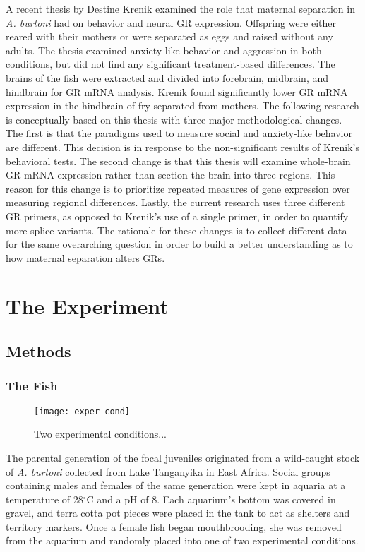 \documentclass[12pt,twoside]{reedthesis}
\begin{document}
A recent thesis by Destine Krenik examined the role that maternal separation in
\textit{A. burtoni} had on behavior and neural GR
expression. Offspring were either reared with their mothers or were separated as
eggs and raised without any adults. The thesis examined anxiety-like behavior and aggression in both
conditions, but did not find any significant treatment-based differences. The
brains of the fish were extracted and divided into forebrain, midbrain, and hindbrain for
GR mRNA analysis. Krenik found significantly lower GR mRNA expression in
the hindbrain of fry separated from mothers. The following research is
conceptually based on this thesis with three major methodological changes. The
first is that the paradigms used to measure social and anxiety-like behavior
are different. This decision is in response to the non-significant results of
Krenik's behavioral tests. The second change is that this thesis will examine
whole-brain GR mRNA expression rather than section the brain into three regions.
This reason for this change is to prioritize repeated measures of gene
expression over measuring regional differences. Lastly,
the current research uses three different GR primers, as opposed to Krenik's use
of a single primer, in order to quantify
more splice variants. The rationale for these changes is to collect different
data for the same overarching question in order to build a better understanding
as to how
maternal separation alters GRs.

\chapter{The Experiment}

\section{Methods}
\subsection{The Fish}

\begin{figure}[htbp] 
\begin{centering} 
\texttt{[image: exper\_cond]}
\caption[Experimental Conditions]{Two experimental conditions...} 
\label{subd}
\end{centering} 
\end{figure}


The parental generation of the focal juveniles originated from a wild-caught
stock of \textit{A. burtoni} collected from Lake Tanganyika in East Africa.
Social groups containing males and females of the same generation were kept in
aquaria at a temperature of 28$^\circ$C and a pH of 8. Each aquarium's bottom
was covered in gravel, and terra cotta pot pieces were placed in the tank to act
as shelters and territory markers. Once a female fish began mouthbrooding, she
was removed from the aquarium and randomly placed into one of two experimental
conditions.
\end{document}

